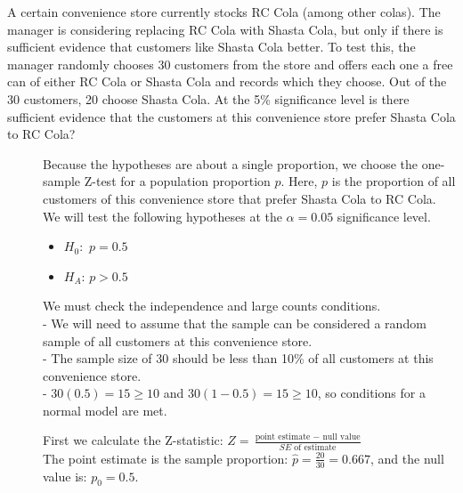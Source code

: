 \begin{examplewrap}
\begin{nexample}{A certain convenience store currently stocks RC Cola (among other colas).  The manager is considering replacing RC Cola with Shasta Cola, but only if there is sufficient evidence that customers like Shasta Cola better.  To test this, the manager randomly chooses 30 customers from the store and offers each one a free can of either RC Cola or Shasta Cola and records which they choose.  Out of the 30 customers, 20 choose Shasta Cola.  At the 5\% significance level is there sufficient evidence that the customers at this convenience store prefer Shasta Cola to RC Cola?}
\label{NuclearEnergy}
\begin{description}
\item[]  Because the hypotheses are about a single proportion, we choose the one-sample Z-test for a population proportion $p$.  Here, $p$ is the proportion of all customers of this convenience store that prefer Shasta Cola to RC Cola.   We will test the following hypotheses at the $\alpha=0.05$ significance level.
\begin{itemize}
\setlength{\itemsep}{0mm}
\item[] $H_0$:\, $p = 0.5$ 
\item[]  $H_A$: $p > 0.5$ 
\end{itemize} 
\item[]  We must check the independence and large counts conditions.\\
- We will need to assume that the sample can be considered a random sample of all customers at this convenience store.  \\
- The sample size of 30 should be less than 10\% of all customers at this convenience store.   \\
- $30(0.5) = 15 \geq 10$ and $30(1-0.5) = 15 \geq 10$, so conditions for a normal model are met.  
\item[  ]  First we calculate the Z-statistic: $Z = \frac{\text{point estimate } - \text{ null value}}{SE \text{ of estimate}}$\\

The point estimate is the sample proportion: $\hat{p} = \frac{20}{30} = 0.667$, and the null value is: $p_0 = 0.5$. \\


\end{description}
\end{nexample}
\end{examplewrap}

